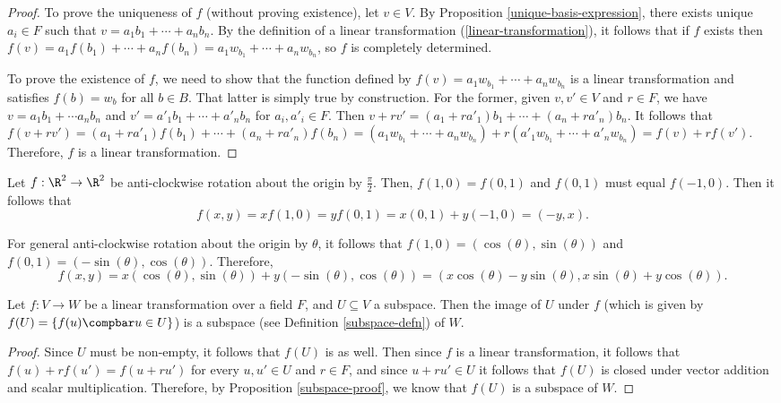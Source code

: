 \documentclass[12pt]{article}
\begin{document}
\begin{proof}\proofbreak

To prove the uniqueness of $f$ (without proving existence), let $v \in V$. By Proposition \ref{unique-basis-expression}, there exists unique $a_i \in F$ such that $v = a_1b_1 + \cdots + a_nb_n$. By the definition of a linear transformation (\ref{linear-transformation}), it follows that if $f$ exists then $f(v) = a_1f(b_1) + \cdots + a_nf(b_n) = a_1w_{b_1} + \cdots + a_nw_{b_n}$, so $f$ is completely determined.

To prove the existence of $f$, we need to show that the function defined by $f(v) = a_1w_{b_1} + \cdots + a_nw_{b_n}$ is a linear transformation and satisfies $f(b) = w_b$ for all $b \in B$. That latter is simply true by construction. For the former, given $v, v' \in V$ and $r \in F$, we have $v = a_1b_1 + \cdots a_nb_n$ and $v' = a'_1b_1 + \cdots + a'_nb_n$ for $a_i, a'_i \in F$. Then $v + rv' = (a_1 + ra'_1)b_1 + \cdots + (a_n + ra'_n)b_n$. It follows that $f(v + rv') = (a_1 + ra'_1)f(b_1) + \cdots + (a_n + ra'_n)f(b_n) = (a_1w_{b_1} + \cdots + a_nw_{b_n}) + r(a'_1w_{b_1} + \cdots + a'_nw_{b_n}) = f(v) + rf(v')$. Therefore, $f$ is a linear transformation.
\end{proof}

\begin{exmp}
    Let $f: \R^2 \to \R^2$ be anti-clockwise rotation about the origin by $\frac{\pi}{2}$. Then, $f(1, 0) = f(0, 1)$ and $f(0, 1)$ must equal $f(-1, 0)$. Then it follows that \[f(x, y) = xf(1, 0) = yf(0, 1) = x(0, 1) + y(-1, 0) = (-y, x).\]
\end{exmp}

\begin{exmp}
    For general anti-clockwise rotation about the origin by $\theta$, it follows that $f(1, 0) = (\cos(\theta), \sin(\theta))$ and $f(0, 1) = (-\sin(\theta), \cos(\theta))$. Therefore, \[f(x, y) = x(\cos(\theta), \sin(\theta)) + y(-\sin(\theta), \cos(\theta)) = (x\cos(\theta) - y\sin(\theta), x\sin(\theta) + y\cos(\theta)).\]
\end{exmp}

\begin{prop}
    Let $f: V \to W$ be a linear transformation over a field $F$, and $U \subseteq V$ a subspace. Then the image of $U$ under $f$ (which is given by $f(U) = \left\{f(u) \compbar u \in U\right\}$) is a subspace (see Definition \ref{subspace-defn}) of $W$.
\end{prop}

\begin{proof}
    Since $U$ must be non-empty, it follows that $f(U)$ is as well. Then since $f$ is a linear transformation, it follows that $f(u) + rf(u') = f(u + ru')$ for every $u, u' \in U$ and $r \in F$, and since $u + ru' \in U$ it follows that $f(U)$ is closed under vector addition and scalar multiplication. Therefore, by Proposition \ref{subspace-proof}, we know that $f(U)$ is a subspace of $W$.
\end{proof}
\end{document}
